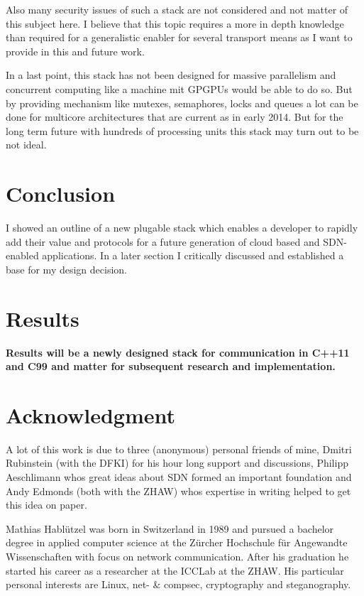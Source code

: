\documentclass[twocolumn,english]{IEEEtran}
\theoremstyle{plain}
\theoremstyle{plain}
\begin{document}
Also many security issues of such a stack are not considered and not matter
of this subject here. I believe that this topic requires a more in depth
knowledge than required for a generalistic enabler for several transport
means as I want to provide in this and future work.

In a last point, this stack has not been designed for massive parallelism and
concurrent computing like a machine mit GPGPUs would be able to do so. But by
providing mechanism like mutexes, semaphores, locks and queues a lot can be
done for multicore architectures that are current as in early 2014. But for
the long term future with hundreds of processing units this stack may turn out
to be not ideal.

\section{Conclusion}

I showed an outline of a new plugable stack which enables a developer to
rapidly add their value and protocols for a future generation of cloud based
and SDN-enabled applications. In a later section I critically discussed and established
a base for my design decision.

\section{Results}

\textbf{Results will be a newly designed stack for communication in C++11 and
C99 and matter for subsequent research and implementation.}

\section*{Acknowledgment}

A lot of this work is due to three (anonymous) personal friends of mine, Dmitri
Rubinstein (with the DFKI) for his hour long support and discussions, Philipp
Aeschlimann whos great ideas about SDN formed an important foundation and
Andy Edmonds (both with the ZHAW) whos expertise in writing helped to get
this idea on paper.





\begin{IEEEbiography}
{Mathias Hablützel} was born in Switzerland in 1989 and pursued a bachelor
degree in applied computer science at the Zürcher Hochschule für Angewandte
Wissenschaften with focus on network communication. After his graduation he
started his career as a researcher at the ICCLab at the ZHAW. His particular
personal interests are Linux, net- \& compsec, cryptography and steganography.

\end{IEEEbiography}
\end{document}
